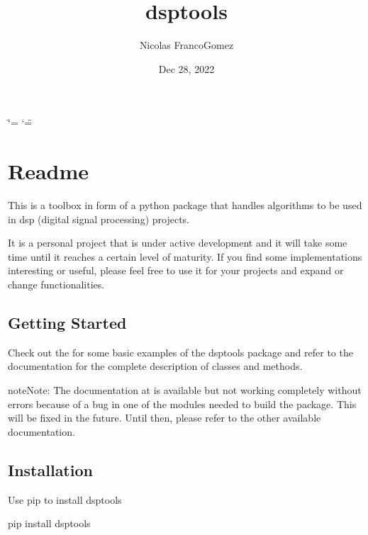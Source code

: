 \documentclass[letterpaper,10pt,english]{sphinxmanual}
\title{dsptools}
\date{Dec 28, 2022}
\author{Nicolas Franco\sphinxhyphen{}Gomez}
\begin{document}
\ifdefined\shorthandoff
  \ifnum\catcode`\=\string=\active\shorthandoff{=}\fi
  \ifnum\catcode`\"=\active{}\fi
\fi

\pagestyle{empty}
\sphinxmaketitle
\pagestyle{plain}
\sphinxtableofcontents
\pagestyle{normal}
\label{\detokenize{index::doc}}


\sphinxstepscope


\chapter{Readme}
\label{\detokenize{readme:readme}}\label{\detokenize{readme::doc}}
\sphinxAtStartPar
This is a toolbox in form of a python package that handles algorithms to be used in dsp (digital signal processing) projects.

\sphinxAtStartPar
It is a personal project that is under active development and it will take some time until it reaches a certain level of maturity.
If you find some implementations interesting or useful, please feel free to use it for your projects and expand or change
functionalities.


\section{Getting Started}
\label{\detokenize{readme:getting-started}}
\sphinxAtStartPar
Check out the  for some basic examples of the dsptools package
and refer to the documentation for the complete description of classes and methods.

\begin{sphinxadmonition}{note}{Note:}
\sphinxAtStartPar
The documentation at  is available but not working completely without errors
because of a bug in one of the modules needed to build the package. This will be fixed in the future.
Until then, please refer to the other available documentation.
\end{sphinxadmonition}


\section{Installation}
\label{\detokenize{readme:installation}}
\sphinxAtStartPar
Use pip to install dsptools

\begin{sphinxVerbatim}[commandchars=\\\{\}]
pip install dsptools
\end{sphinxVerbatim}
\end{document}
